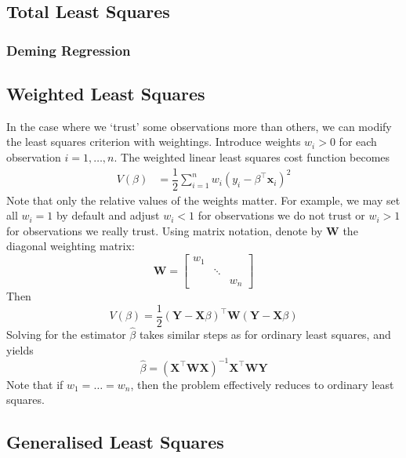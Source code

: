 \documentclass[11pt]{report} %
\begin{document}
\subsection{Total Least Squares}

\subsubsection{Deming Regression}

\subsection{Weighted Least Squares}

In the case where we `trust' some observations more than others, we can modify the least squares criterion with weightings. Introduce weights $w_{i} > 0$ for each observation $i = 1, \dots, n$. The weighted linear least squares cost function becomes
\begin{align}
V\left(\beta\right) &= \dfrac{1}{2}\sum_{i = 1}^{n}w_{i}\left(y_{i} - \beta^{\top}\mathbf{x}_{i}\right)^{2}
\end{align}
Note that only the relative values of the weights matter. For example, we may set all $w_{i} = 1$ by default and adjust $w_{i} < 1$ for observations we do not trust or $w_{i} > 1$ for observations we really trust. Using matrix notation, denote by $\mathbf{W}$ the diagonal weighting matrix:
\begin{equation}
\mathbf{W} = \begin{bmatrix}
w_{1} & & \\ & \ddots & \\ & & w_{n}
\end{bmatrix}
\end{equation}
Then
\begin{equation}
V\left(\beta\right) = \dfrac{1}{2}\left(\mathbf{Y} - \mathbf{X}\beta\right)^{\top}\mathbf{W}\left(\mathbf{Y} - \mathbf{X}\beta\right)
\end{equation}
Solving for the estimator $\hat{\beta}$ takes similar steps as for ordinary least squares, and yields
\begin{equation}
\hat{\beta} = \left(\mathbf{X}^{\top}\mathbf{W}\mathbf{X}\right)^{-1}\mathbf{X}^{\top}\mathbf{W}\mathbf{Y}
\end{equation}
Note that if $w_{1} = \dots = w_{n}$, then the problem effectively reduces to ordinary least squares.

\subsection{Generalised Least Squares \cite{Verbeek2017}}
\end{document}
